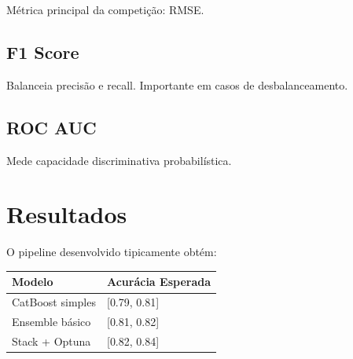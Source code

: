 \documentclass[12pt,a4paper]{article}
\begin{document}
Métrica principal da competição: RMSE.
\subsection{F1 Score}
\label{sec:org8bdb1a2}
Balanceia precisão e recall. Importante em casos de desbalanceamento.
\subsection{ROC AUC}
\label{sec:orga628520}
Mede capacidade discriminativa probabilística.
\section{Resultados}
\label{sec:org2422f5b}
O pipeline desenvolvido tipicamente obtém:

\begin{center}
\begin{tabular}{ll}
Modelo & Acurácia Esperada\\
\hline
CatBoost simples & {[}0.79, 0.81]\\
Ensemble básico & {[}0.81, 0.82]\\
Stack + Optuna & {[}0.82, 0.84]\\
\end{tabular}
\end{center}
\end{document}
